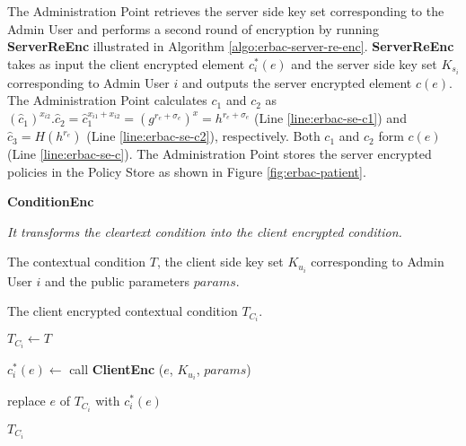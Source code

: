 \documentclass[epsfig,a4paper,11pt,titlepage]{book}
\numberwithin{algorithm}{chapter}
\newcommand{\algofontsize}{\fontsize{11}{12}\selectfont}
\begin{document}
The Administration Point retrieves the server side key set corresponding to the Admin User and performs a second round of encryption by running \textbf{ServerReEnc} illustrated in Algorithm \ref{algo:erbac-server-re-enc}. \textbf{ServerReEnc} takes as input the client encrypted element $c^*_i (e)$ and the server side key set $K_{s_i}$ corresponding to Admin User $i$ and outputs the server encrypted element $c(e)$. The Administration Point calculates $c_1$ and $c_2$ as $(\hat{c}_1)^{x_{i2}}.\hat{c}_2 = \hat{c}_1^{x_{i1}+x_{i2}} = (g^{r_e+{\sigma}_e})^x = h^{r_e+{\sigma}_e}$ (Line \ref{line:erbac-se-c1}) and $\hat{c}_3 = H(h^{r_e})$ (Line \ref{line:erbac-se-c2}), respectively. Both $c_1$ and $c_2$ form $c(e)$ (Line \ref{line:erbac-se-c}). The Administration Point stores the server encrypted policies in the Policy Store as shown in Figure \ref{fig:erbac-patient}.





\begin{algorithm} [htp]
{\algofontsize
\caption{\textbf{ConditionEnc}}

\label{algo:erbac-deploy-contextual-condition-client-side}

\begin{algorithmic}[1]

\INPUT \emph{It transforms the cleartext condition into the client encrypted condition.}

\Require The contextual condition $T$, the client side key set $K_{u_i}$ corresponding to Admin User $i$ and the public parameters $params$.

\Ensure The client encrypted contextual condition $T_{C_i}$.

\medskip

\State $T_{C_i} \leftarrow T$ \label{line:erbac-deploy-cc-cs-copy}

 \label{line:erbac-deploy-cc-cs-loop}

	\State $c^*_i (e) \leftarrow$ call \textbf{ClientEnc} ($e$, $K_{u_i}$, $params$) \label{line:erbac-deploy-cc-cs-call}
	
	\State replace $e$ of $T_{C_i}$ with $c^*_i (e)$ \label{line:erbac-deploy-cc-cs-replace}

\EndFor

\Return $T_{C_i}$

\end{algorithmic}
}
\end{algorithm}
\end{document}
